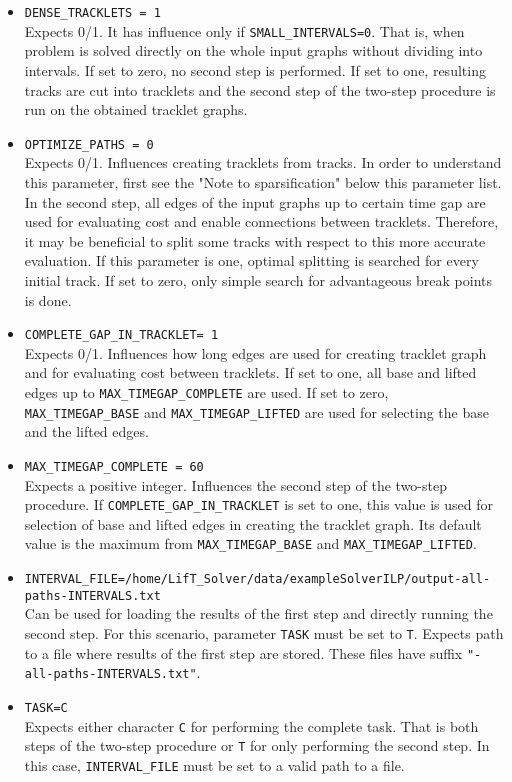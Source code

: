 \documentclass[a4paper,10pt]{article}
\begin{document}
\begin{itemize}
\item \texttt{DENSE\_TRACKLETS = 1}\\
Expects 0/1. It has influence only if \texttt{SMALL\_INTERVALS=0}. That is, when problem is solved directly on the whole input graphs without dividing into intervals. If set to zero, no second step is performed. If set to one, resulting tracks are cut into tracklets and the second step of the two-step procedure is run on the obtained tracklet graphs.

\item \texttt{OPTIMIZE\_PATHS = 0}\\
 Expects 0/1. Influences creating tracklets from tracks. In order to understand this parameter, first see the "Note to sparsification" below this parameter list. In the second step, all edges of the input graphs up to certain time gap are used for evaluating cost and enable connections between tracklets. Therefore, it may be beneficial to split some tracks with respect to this more accurate evaluation. If this parameter is one, optimal splitting is searched for every initial track. If set to zero, only simple search for advantageous break points is done.
 
 \item \texttt{COMPLETE\_GAP\_IN\_TRACKLET= 1 }\\
Expects 0/1. Influences how long edges are used for creating tracklet graph and for evaluating cost between tracklets. If set to one, all base and lifted edges up to \texttt{MAX\_TIMEGAP\_COMPLETE} are used. If set to zero, \texttt{MAX\_TIMEGAP\_BASE} and \texttt{MAX\_TIMEGAP\_LIFTED} are used for selecting the base and the lifted edges.
\item \texttt{MAX\_TIMEGAP\_COMPLETE = 60}\\
Expects a positive integer. Influences the second step of the two-step procedure. If \texttt{COMPLETE\_GAP\_IN\_TRACKLET} is set to one, this value is used for selection of base and lifted edges in creating the tracklet graph.  Its default value is the maximum from \texttt{MAX\_TIMEGAP\_BASE} and \texttt{MAX\_TIMEGAP\_LIFTED}.

\item \texttt{INTERVAL\_FILE=/home/LifT\_Solver/data/exampleSolverILP/output-all-paths-INTERVALS.txt}\\
Can be used for loading the results of the first step and directly running the second step. For this scenario, parameter \texttt{TASK} must be set to \texttt{T}. Expects path to a file where results of the first step are stored. These files have suffix \texttt{"-all-paths-INTERVALS.txt"}.
\item \texttt{TASK=C}\\
 Expects either character \texttt{C} for performing the complete task. That is both steps of the two-step procedure or \texttt{T} for only performing the second step. In this case, \texttt{INTERVAL\_FILE} must be set to a valid path to a file.

\end{itemize}
\end{document}
